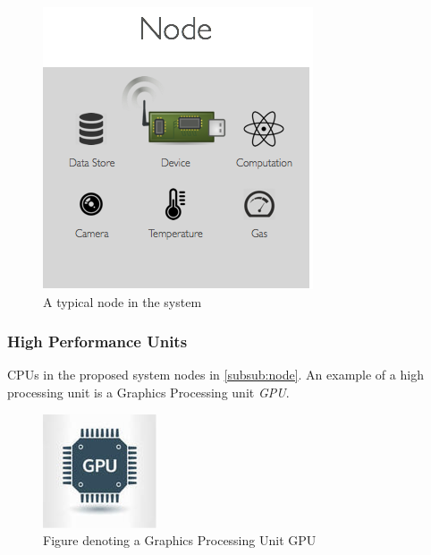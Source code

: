\begin{figure}[H]
\centering
 \includegraphics[scale=0.4]{images/node.png}
 \caption{A typical node in the system}
 \label{fig:node}
\end{figure}

\subsubsection{High Performance  Units }

CPUs in the proposed system nodes in \ref{subsub:node}. An example of a high processing unit is  a Graphics Processing unit \textit{GPU}.

\begin{figure}[H]
	\centering
	\includegraphics[scale=0.7]{images/gpu.png}
		\caption{Figure denoting a Graphics Processing Unit GPU}
	\label{fig:gpu}
\end{figure}


